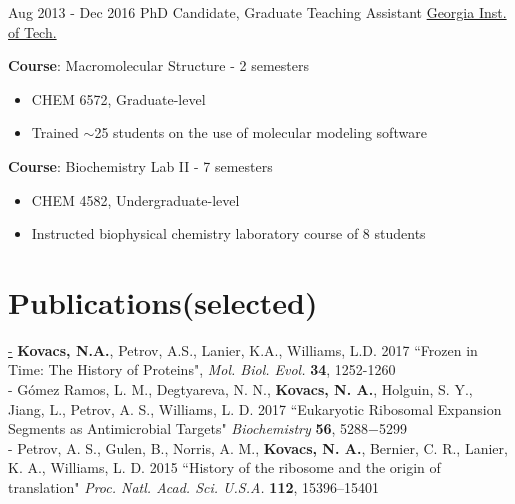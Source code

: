 \documentclass[letterpaper]{twentysecondcv}
\begin{document}
\begin{twenty}
        	\twentyitem
    	{Aug 2013 -}
		{Dec 2016}
        {PhD Candidate, Graduate Teaching Assistant}
        {\href{https://ww2.chemistry.gatech.edu/~lw26/}{Georgia Inst. of Tech.}}
        {}
        {
       	\textbf{Course}: Macromolecular Structure - 2 semesters
        {\begin{itemize}
        \item CHEM 6572, Graduate-level
        \item Trained $\sim$25 students on the use of molecular modeling software
		\end{itemize}}
       	\textbf{Course}: Biochemistry Lab II - 7 semesters
        {\begin{itemize}
        \item CHEM 4582, Undergraduate-level
        \item Instructed biophysical chemistry laboratory course of 8 students
 \vspace{2mm}
		\end{itemize}}
        }
\end{twenty}


\section{Publications\scriptsize{(selected)}}\href{https://scholar.google.com/citations?user=KIFFrX4AAAAJ&hl=en}
- {\bf Kovacs, N.A.}, Petrov, A.S., Lanier, K.A., Williams, L.D. 2017 ``Frozen in Time: The History of Proteins", {\it Mol. Biol. Evol.} {\bf 34}, 1252-1260\vspace{2.0mm}\\
- Gómez Ramos, L. M., Degtyareva, N. N., {\bf Kovacs, N. A.}, Holguin, S. Y., Jiang, L., Petrov, A. S., Williams, L. D. 2017 ``Eukaryotic Ribosomal Expansion Segments as Antimicrobial Targets" {\it Biochemistry} {\bf 56}, 5288−5299\vspace{2.0mm}\\
- Petrov, A. S., Gulen, B., Norris, A. M., {\bf Kovacs, N. A.}, Bernier, C. R., Lanier, K. A., Williams, L. D. 2015 ``History of the ribosome and the origin of translation" {\it Proc. Natl. Acad. Sci. U.S.A.} {\bf 112}, 15396–15401\\

\end{document}
